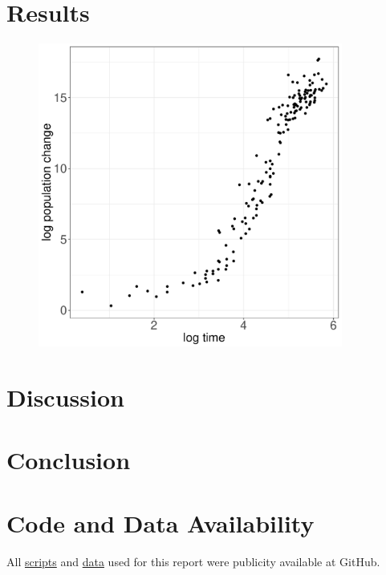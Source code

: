 \documentclass[a4paper, 11pt]{article}
\begin{document}
	\section*{Results}
	\begin{figure}[h]
		\centering\includegraphics[width=10cm]{Log_data.pdf}
	\end{figure}
	\section*{Discussion}
	\section*{Conclusion}
	\section*{Code and Data Availability}
	All \href{https://github.com/ph-u/CMEECourseWork_pmH/tree/master/MiniProject/code}{scripts} and \href{https://github.com/ph-u/CMEECourseWork_pmH/tree/master/MiniProject/data}{data} used for this report were publicity available at GitHub.
	\nocite{*}\printbibliography
\end{document}
